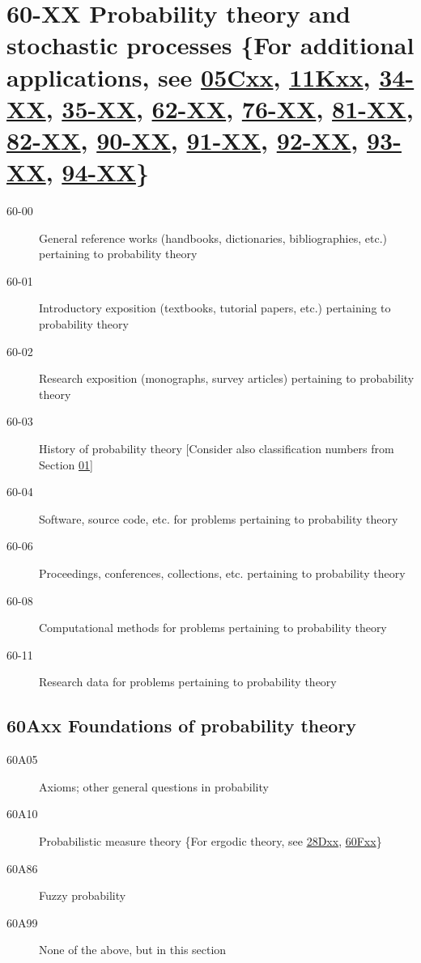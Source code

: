 \section*{60-XX Probability theory and stochastic processes \{For additional applications, see \hyperref[05Cxx]{05Cxx}, \hyperref[11Kxx]{11Kxx}, \hyperref[34-XX]{34-XX}, \hyperref[35-XX]{35-XX}, \hyperref[62-XX]{62-XX}, \hyperref[76-XX]{76-XX}, \hyperref[81-XX]{81-XX}, \hyperref[82-XX]{82-XX}, \hyperref[90-XX]{90-XX}, \hyperref[91-XX]{91-XX}, \hyperref[92-XX]{92-XX}, \hyperref[93-XX]{93-XX}, \hyperref[94-XX]{94-XX}\} }\label{60-XX}
\begin{description}
\item [60-00]\label{60-00} General reference works (handbooks, dictionaries, bibliographies, etc.) pertaining to probability theory
\item [60-01]\label{60-01} Introductory exposition (textbooks, tutorial papers, etc.) pertaining to probability theory
\item [60-02]\label{60-02} Research exposition (monographs, survey articles) pertaining to probability theory
\item [60-03]\label{60-03} History of probability theory [Consider also classification numbers from Section \hyperref[01-XX]{01}]
\item [60-04]\label{60-04} Software, source code, etc. for problems pertaining to probability theory
\item [60-06]\label{60-06} Proceedings, conferences, collections, etc. pertaining to probability theory
\item [60-08]\label{60-08} Computational methods for problems pertaining to probability theory
\item [60-11]\label{60-11} Research data for problems pertaining to probability theory
\end{description}
\subsection*{60Axx  Foundations of probability theory }\label{60Axx}
\begin{description}  
\item [60A05]\label{60A05} Axioms; other general questions in probability
\item [60A10]\label{60A10} Probabilistic measure theory \{For ergodic theory, see \hyperref[28Dxx]{28Dxx}, \hyperref[60Fxx]{60Fxx}\}
\item [60A86]\label{60A86} Fuzzy probability
\item [60A99]\label{60A99} None of the above, but in this section
\end{description}
